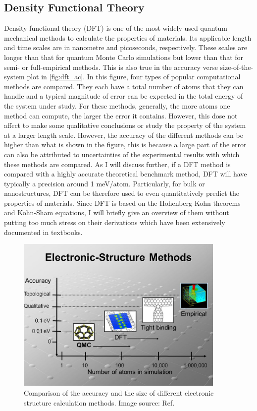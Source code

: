 \subsection{Density Functional Theory}
%
Density functional theory (DFT) is one of the most widely used quantum mechanical methods to calculate the properties of materials. Its applicable length and time scales are in nanometre and picoseconds, respectively. These scales are longer than that for quantum Monte Carlo simulations but lower than that for semi- or full-empirical methods. This is also true in the accuracy verse size-of-the-system plot in \autoref{fig:dft_ac}. In this figure, four types of popular computational methods are compared. They each have a total number of atoms that they can handle and a typical magnitude of error can be expected in the total energy of the system under study. For these methods, generally, the more atoms one method can compute, the larger the error it contains. However, this dose not affect to make some qualitative conclusions or study the property of the system at a larger length scale. However, the accuracy of the different methods can be higher than what is shown in the figure, this is because a large part of the error can also be attributed to uncertainties of the experimental results with which these methods are compared\cite{Kirklin2015}. As I will discuss further, if a DFT method is compared with a highly accurate theoretical benchmark method, DFT will have typically a precision around 1 meV/atom. Particularly, for bulk or nanostructures, DFT can be therefore used to even quantitatively predict the properties of materials. Since DFT is based on the Hohenberg-Kohn theorems\cite{Hohenberg1964} and Kohn-Sham equations\cite{Kohn1965}, I will briefly give an overview of them without putting too much stress on their derivations which have been extensively documented in textbooks. 
%
\begin{figure}[htbp!] 
\centering  
\includegraphics[width=0.9\textwidth]{dft1.jpg}
\caption[Comparison of different electronic structure calculation methods]{ Comparison of the accuracy and the size of different electronic structure calculation methods. Image source: Ref. \cite{dft_ac}}  
\label{fig:dft_ac}
\end{figure} 
%

